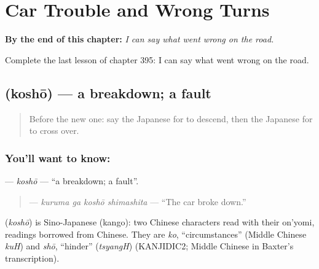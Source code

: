 
\chapter{Car Trouble and Wrong Turns}
\label{ch:ja-car-trouble-and-wrong-turns}

\begin{chapteropening}
\textbf{By the end of this chapter:} \emph{I can say what went wrong on the road.}

Complete the last lesson of chapter 395: I can say what went wrong on the road.
\end{chapteropening}

\section[\texorpdfstring{\ja{こしょう} (koshō)}{こしょう (koshō)}]{ (koshō) — a breakdown; a fault}

\label{lesson:JA-C395-koshou}



\begin{quote}
Before the new one: say the Japanese for to descend, then the Japanese for to cross over.
\end{quote}

\subsection*{You'll want to know: }
\textbf{} — \emph{koshō} — \textquotedblleft{}a breakdown; a fault\textquotedblright{}.

\begin{quote}
\textbf{ } — \emph{kuruma ga koshō shimashita} — \textquotedblleft{}The car broke down.\textquotedblright{}
\end{quote}

\begin{cousinweb}
\textbf{} (\emph{koshō}) is Sino-Japanese (kango): two Chinese characters read with their on'yomi, readings borrowed from Chinese. They are \emph{ko}, \textquotedblleft{}circumstances\textquotedblright{} (Middle Chinese \emph{kuH}) and \emph{shō}, \textquotedblleft{}hinder\textquotedblright{} (\emph{tsyangH}) (KANJIDIC2; Middle Chinese in Baxter's transcription).
\end{cousinweb}

